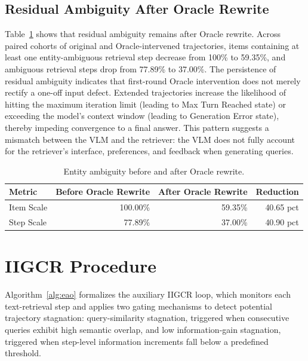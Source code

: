 \documentclass{article} %
\begin{document}
\subsection{Residual Ambiguity After Oracle Rewrite}
Table~\ref{tab:oracle-rewrite-entity-ambiguity} shows that residual ambiguity remains after Oracle rewrite. Across paired cohorts of original and Oracle-intervened trajectories, items containing at least one entity-ambiguous retrieval step decrease from 100\% to 59.35\%, and ambiguous retrieval steps drop from 77.89\% to 37.00\%. 
The persistence of residual ambiguity indicates that first-round Oracle intervention does not merely rectify a one-off input defect. 
Extended trajectories increase the likelihood of hitting the maximum iteration limit (leading to Max Turn Reached state) or exceeding the model’s context window (leading to Generation Error state), thereby impeding convergence to a final answer. This pattern suggests a mismatch between the VLM and the retriever: the VLM does not fully account for the retriever's interface, preferences, and feedback when generating queries.
\begin{table}[htbp]
\centering
\small
\setlength{\tabcolsep}{6pt}
\caption{Entity ambiguity before and after Oracle rewrite.}
\begin{tabular}{lrrr}
\hline
\textbf{Metric} & \textbf{Before Oracle Rewrite} & \textbf{After Oracle Rewrite} & \textbf{Reduction} \\
\hline
Item Scale & 100.00\% & 59.35\% & 40.65 pct \\
Step Scale & 77.89\% & 37.00\% & 40.90 pct \\
\hline
\end{tabular}
\label{tab:oracle-rewrite-entity-ambiguity}
\end{table}

\section{IIGCR Procedure}\label{app:algorithm}
Algorithm~\ref{alg:eao} formalizes the auxiliary IIGCR loop, which monitors each text-retrieval step and applies two gating mechanisms to detect potential trajectory stagnation: query-similarity stagnation, triggered when consecutive queries exhibit high semantic overlap, and low information-gain stagnation, triggered when step-level information increments fall below a predefined threshold.



\end{document}
